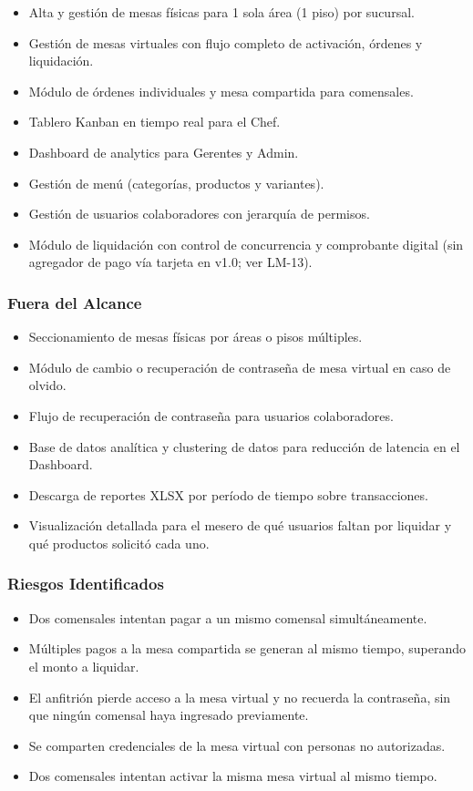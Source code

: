 \begin{itemize}[leftmargin=1.5em]
  \item Alta y gestión de mesas físicas para 1 sola área (1 piso) por sucursal.
  \item Gestión de mesas virtuales con flujo completo de activación, órdenes y liquidación.
  \item Módulo de órdenes individuales y mesa compartida para comensales.
  \item Tablero Kanban en tiempo real para el Chef.
  \item Dashboard de analytics para Gerentes y Admin.
  \item Gestión de menú (categorías, productos y variantes).
  \item Gestión de usuarios colaboradores con jerarquía de permisos.
  \item M\'odulo de liquidaci\'on con control de concurrencia y comprobante digital
        (sin agregador de pago v\'ia tarjeta en v1.0; ver LM-13).
\end{itemize}

\subsubsection{Fuera del Alcance}

\begin{itemize}[leftmargin=1.5em]
  \item Seccionamiento de mesas físicas por áreas o pisos múltiples.
  \item Módulo de cambio o recuperación de contraseña de mesa virtual en caso de olvido.
  \item Flujo de recuperación de contraseña para usuarios colaboradores.
  \item Base de datos analítica y clustering de datos para reducción de latencia en el Dashboard.
  \item Descarga de reportes XLSX por período de tiempo sobre transacciones.
  \item Visualización detallada para el mesero de qué usuarios faltan por liquidar
        y qué productos solicitó cada uno.
\end{itemize}

\subsubsection{Riesgos Identificados}

\begin{itemize}[leftmargin=1.5em]
  \item Dos comensales intentan pagar a un mismo comensal simultáneamente.
  \item Múltiples pagos a la mesa compartida se generan al mismo tiempo,
        superando el monto a liquidar.
  \item El anfitrión pierde acceso a la mesa virtual y no recuerda la contraseña,
        sin que ningún comensal haya ingresado previamente.
  \item Se comparten credenciales de la mesa virtual con personas no autorizadas.
  \item Dos comensales intentan activar la misma mesa virtual al mismo tiempo.
\end{itemize}

